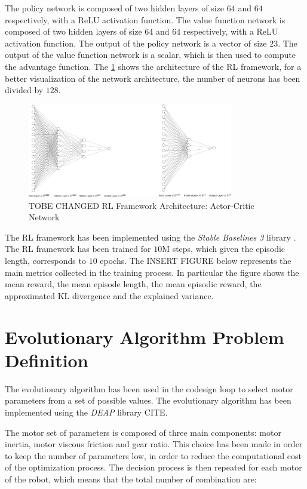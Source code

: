 The policy network is composed of two hidden layers of size $64$ and $64$ respectively, with a \ac{ReLU} activation function. The value function network is composed of two hidden layers of size $64$ and $64$ respectively, with a \ac{ReLU} activation function. The output of the policy network is a vector of size $23$. The output of the value function network is a scalar, which is then used to compute the advantage function. The \cref{fig:rlarchitecture} shows the architecture of the \ac{RL} framework, for a better visualization of the network architecture, the number of neurons has been divided by $128$.

\begin{figure}[h]
    \centering
    \includegraphics[width=0.8\textwidth]{Images/rl_architecture.png}
    \caption{TOBE CHANGED RL Framework Architecture: Actor-Critic Network}
    \label{fig:rlarchitecture}
\end{figure}

The \ac{RL} framework has been implemented using the \textit{Stable Baselines 3} library \cite{raffin_stable-baselines3_2021}. The \ac{RL} framework has been trained for $10$M steps, which given the episodic length, corresponds to $10$ epochs. The INSERT FIGURE below represents the main metrics collected in the training process. In particular the figure shows the mean reward, the mean episode length, the mean episodic reward, the approximated KL divergence and the explained variance.


\section{Evolutionary Algorithm Problem Definition}

The evolutionary algorithm has been used in the codesign loop to select motor parameters from a set of possible values. The evolutionary algorithm has been implemented using the \textit{DEAP} library CITE.

The motor set of parameters is composed of three main components: motor inertia, motor viscous friction and gear ratio. This choice has been made in order to keep the number of parameters low, in order to reduce the computational cost of the optimization process. The decision process is then repeated for each motor of the robot, which means that the total number of combination are:

